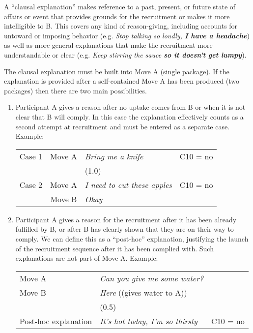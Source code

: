 \documentclass[output=paper]{langsci/langscibook}
\begin{document}
\begin{description}
A “clausal explanation” makes reference to a past, present, or future state of affairs or event that provides grounds for the recruitment or makes it more intelligible to B. This covers any kind of reason-giving, including accounts for untoward or imposing behavior (e.g. \textit{Stop talking so loudly, \textbf{I have a headache}}) as well as more general explanations that make the recruitment more understandable or clear (e.g. \textit{Keep stirring the sauce \textbf{so it doesn’t get lumpy}}).

  The clausal explanation must be built into Move A (single package). If the explanation is provided after a self-contained Move A has been produced (two packages) then there are two main possibilities.

\renewcommand{\theenumi}{\roman{enumi}}
\begin{enumerate}
\item Participant A gives a reason after no uptake comes from B or when it is not clear that B will comply. In this case the explanation effectively counts as a second attempt at recruitment and must be entered as a separate case. Example:

\begin{tabular}{l c l l}
{Case 1} &  Move A & \textit{Bring me a knife}  &   C10 = no \\
                & & (1.0) & \\
{Case 2} &  Move A &  \textit{{I need to cut these apples}} &  {C10 = no} \\
                &  Move B & \textit{Okay} & \\
\end{tabular}

\item
Participant A gives a reason for the recruitment after it has been already fulfilled by B, or after B has clearly shown that they are on their way to comply. We can define this as a “post-hoc” explanation, justifying the launch of the recruitment sequence after it has been complied with. Such explanations are not part of Move A. Example:

\begin{tabular}{l l l}
Move A & \textit{Can you give me some water?}  &    \\
Move B & \textit{Here} ((gives water to A)) & \\
 &  (0.5) & \\
 Post-hoc explanation &  \textit{{It’s hot today, I’m so thirsty}} &  C10 = no\\
\end{tabular}
\end{enumerate}


\end{description}
\end{document}
